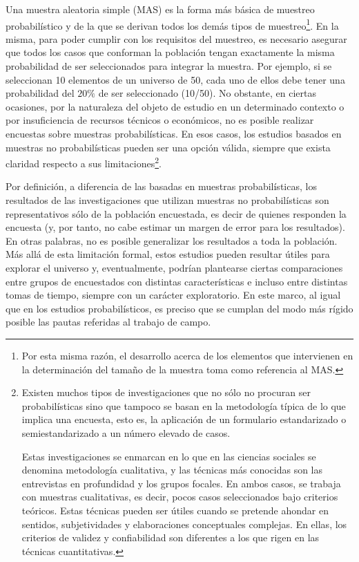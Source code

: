 \documentclass[
]{book}
\begin{document}
Una muestra aleatoria simple (MAS) es la forma más básica de muestreo probabilístico y de la que se derivan todos los demás tipos de muestreo\footnote{Por esta misma razón, el desarrollo acerca de los elementos que intervienen en la determinación del tamaño de la muestra toma como referencia al MAS.}. En la misma, para poder cumplir con los requisitos del muestreo, es necesario asegurar que todos los casos que conforman la población tengan exactamente la misma probabilidad de ser seleccionados para integrar la muestra. Por ejemplo, si se seleccionan 10 elementos de un universo de 50, cada uno de ellos debe tener una probabilidad del \(20\%\) de ser seleccionado (10/50). No obstante, en ciertas ocasiones, por la naturaleza del objeto de estudio en un determinado contexto o por insuficiencia de recursos técnicos o económicos, no es posible realizar encuestas sobre muestras probabilísticas. En esos casos, los estudios basados en muestras no probabilísticas pueden ser una opción válida, siempre que exista claridad respecto a sus limitaciones\footnote{Existen muchos tipos de investigaciones que no sólo no procuran ser probabilísticas sino que tampoco se basan en la metodología típica de lo que implica una encuesta, esto es, la aplicación de un formulario estandarizado o semiestandarizado a un número elevado de casos.

  Estas investigaciones se enmarcan en lo que en las ciencias sociales se denomina metodología cualitativa, y las técnicas más conocidas son las entrevistas en profundidad y los grupos focales. En ambos casos, se trabaja con muestras cualitativas, es decir, pocos casos seleccionados bajo criterios teóricos. Estas técnicas pueden ser útiles cuando se pretende ahondar en sentidos, subjetividades y elaboraciones conceptuales complejas. En ellas, los criterios de validez y confiabilidad son diferentes a los que rigen en las técnicas cuantitativas.}.

Por definición, a diferencia de las basadas en muestras probabilísticas, los resultados de las investigaciones que utilizan muestras no probabilísticas son representativos sólo de la población encuestada, es decir de quienes responden la encuesta (y, por tanto, no cabe estimar un margen de error para los resultados). En otras palabras, no es posible generalizar los resultados a toda la población. Más allá de esta limitación formal, estos estudios pueden resultar útiles para explorar el universo y, eventualmente, podrían plantearse ciertas comparaciones entre grupos de encuestados con distintas características e incluso entre distintas tomas de tiempo, siempre con un carácter exploratorio. En este marco, al igual que en los estudios probabilísticos, es preciso que se cumplan del modo más rígido posible las pautas referidas al trabajo de campo.
\end{document}
